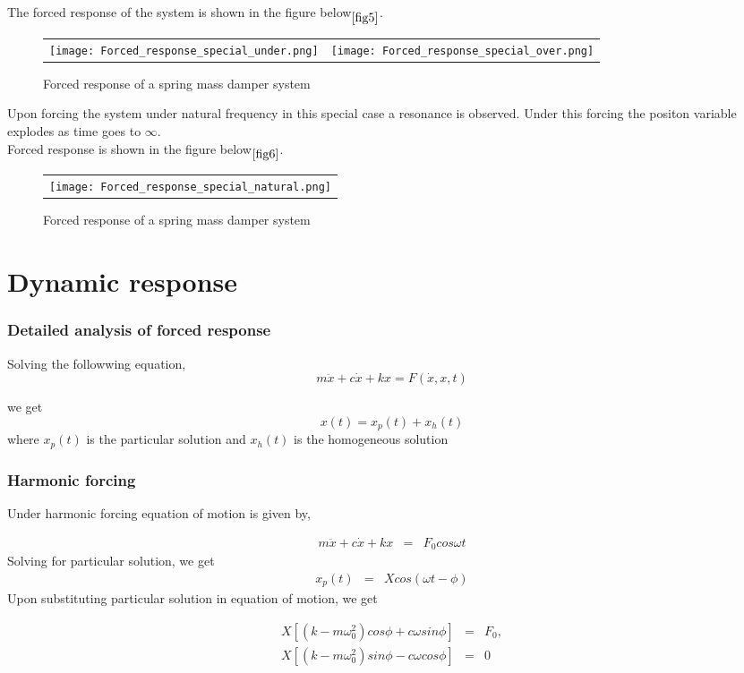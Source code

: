 \documentclass[10pt]{beamer}
\begin{document}
\begin{frame}
The forced response of the system is shown in the figure below$\phantom{}_{\ref{fig5}}$.

\begin{figure}[h]
	\begin{tabular} {l c}
	\texttt{[image: Forced\_response\_special\_under.png]} &
	\texttt{[image: Forced\_response\_special\_over.png]} 
	\end{tabular}
	\caption{Forced response of a spring mass damper system}
\end{figure}
\label{fig8}

\end{frame}
 
\begin{frame}

Upon forcing the system under natural frequency in this special case a resonance is observed. Under this
forcing the positon variable explodes as time goes to $\infty$.\\
Forced response is shown in the figure below$\phantom{}_{\ref{fig6}}$.

\begin{figure}[h]
	\begin{tabular} {l}
	\texttt{[image: Forced\_response\_special\_natural.png]} 
	\end{tabular}
	\caption{Forced response of a spring mass damper system}
\end{figure}
\label{fig9} 

\end{frame}

\section{Dynamic response}

\begin{frame}
\frametitle{Detailed analysis of forced response}
Solving the followwing equation,
$$ m\ddot{x} + c\dot{x} + kx = F(\dot{x},x,t) $$

we get 
$$ x(t) = x_p(t) + x_h(t)$$
where $x_p(t)$ is the particular solution and $x_h(t)$ is the homogeneous solution

\end{frame}

\begin{frame}
\frametitle{Harmonic forcing}
Under harmonic forcing equation of motion is given by,

\begin{eqnarray}
m\ddot{x} + c\dot{x} + kx &=& F_0cos\omega t
\end{eqnarray}
Solving for particular solution, we get
\begin{eqnarray}
x_p(t) &=& Xcos(\omega t - \phi)
\end{eqnarray}
Upon substituting particular solution in equation of motion, we get

\begin{eqnarray}
X[(k - m\omega_0^2)cos\phi + c\omega sin\phi] &=& F_0, \\ 
X[(k - m\omega_0^2)sin\phi - c\omega cos\phi] &=& 0 
\end{eqnarray}

\end{frame}
\end{document}
